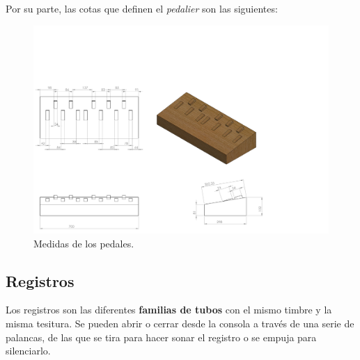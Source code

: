 \smallskip

Por su parte, las cotas que definen el \textit{pedalier} son las siguientes:

\smallskip

\begin{figure}[H]
	\noindent \begin{centering}
		\includegraphics[clip=true,trim=0 0 260 250, width=\linewidth*3/4]{capitulo3/pedalier_modelo}
		\par\end{centering}
	\smallskip
	\caption{\label{fig:pedalier_modelo} Medidas de los pedales.}
\end{figure} 

\smallskip

\subsection{Registros}

Los registros son las diferentes \textbf{familias de tubos} con el mismo timbre y la misma tesitura. Se pueden abrir o cerrar desde la consola a través de una serie de palancas, de las que se tira para hacer sonar el registro o se empuja para silenciarlo.

\smallskip

